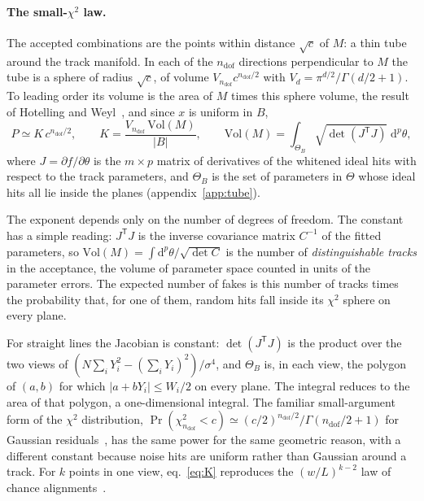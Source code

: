 \IfFileExists{jinst.cls}{\documentclass[a4paper,11pt]{jinst}}
\newcommand{\ndof}{n_\mathrm{dof}}
\newcommand{\Vol}{\mathrm{Vol}}
\newcommand{\dd}{\mathrm{d}}
\begin{document}
\paragraph{The small-$\chi^2$ law.} The accepted combinations are the points within distance
$\sqrt c$ of $M$: a thin tube around the track manifold. In each of the $\ndof$ directions
perpendicular to $M$ the tube is a sphere of radius $\sqrt c$, of volume $V_{\ndof}c^{\ndof/2}$
with $V_d=\pi^{d/2}/\Gamma(d/2+1)$. To leading order its volume is the area of $M$ times this
sphere volume, the result of Hotelling and Weyl~\cite{Hotelling:1939,Weyl:1939}, and since $x$
is uniform in $B$,
\begin{equation}
  P \simeq K\,c^{\ndof/2},\qquad K = \frac{V_{\ndof}\,\Vol(M)}{|B|},\qquad
  \Vol(M)=\int_{\Theta_B}\sqrt{\det\!\left(J^\mathsf{T}J\right)}\;\dd^p\theta ,
  \label{eq:K}
\end{equation}
where $J=\partial f/\partial\theta$ is the $m\times p$ matrix of derivatives of the whitened
ideal hits with respect to the track parameters, and $\Theta_B$ is the set of parameters in
$\Theta$ whose ideal hits all lie inside the planes (appendix~\ref{app:tube}).

The exponent depends only on the number of degrees of freedom. The constant has a simple
reading: $J^\mathsf{T}J$ is the inverse covariance matrix $C^{-1}$ of the fitted parameters, so
$\Vol(M)=\int\dd^p\theta/\sqrt{\det C}$ is the number of \emph{distinguishable tracks} in the
acceptance, the volume of parameter space counted in units of the parameter errors. The
expected number of fakes is this number of tracks times the probability that, for one of
them, random hits fall inside its $\chi^2$ sphere on every plane.

For straight lines the Jacobian is constant: $\det(J^\mathsf{T}J)$ is the product over the two
views of $(N\sum_iY_i^2-(\sum_iY_i)^2)/\sigma^4$, and $\Theta_B$ is, in each view, the polygon of
$(a,b)$ for which $|a+bY_i|\le W_i/2$ on every plane. The integral reduces to the area of that
polygon, a one-dimensional integral. The familiar small-argument form of the $\chi^2$
distribution, $\Pr(\chi^2_{\ndof}<c)\simeq(c/2)^{\ndof/2}/\Gamma(\ndof/2+1)$ for Gaussian
residuals~\cite{DLMF}, has the same power for the same geometric reason, with a different
constant because noise hits are uniform rather than Gaussian around a track. For $k$ points in
one view, eq.~\eqref{eq:K} reproduces the $(w/L)^{k-2}$ law of chance
alignments~\cite{Kendall:1980,Broadbent:1980}.
\end{document}
